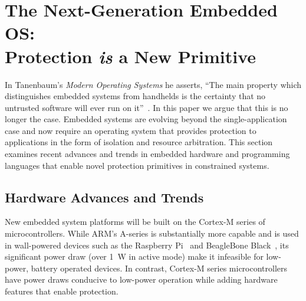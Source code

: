 \section{The Next-Generation Embedded OS:\\Protection \emph{is} a New Primitive}
\label{protection}

In Tanenbaum's \emph{Modern Operating Systems} he asserts, ``The main property
which distinguishes embedded systems from handhelds is the certainty that no
untrusted software will ever run on it''~\cite{tanenbaum}. In this paper we
argue that this is no longer the case. Embedded systems are evolving beyond the
single-application case and now require an operating system that provides
protection to applications in the form of isolation and resource arbitration.
%
This section examines recent advances and trends in embedded hardware and
programming languages that enable novel protection primitives in constrained
systems.

\subsection{Hardware Advances and Trends}

New embedded system platforms will be built on the Cortex-M series of microcontrollers.
While ARM's A-series is substantially more capable and is used in wall-powered
devices such as the Raspberry Pi~\cite{rpi} and BeagleBone Black~\cite{bbb},
its significant power draw (over 1~W in active mode) make it infeasible for
low-power, battery operated devices.
In contrast, Cortex-M series microcontrollers have power draws conducive to
low-power operation while adding hardware features that enable protection.



